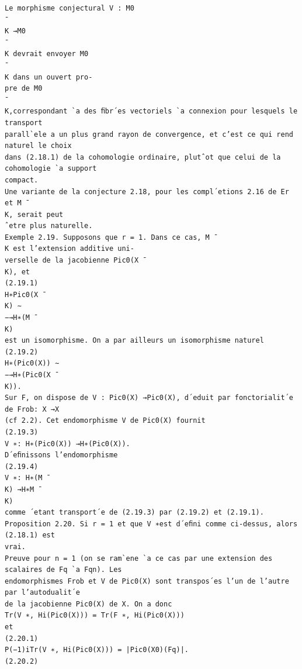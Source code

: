 \documentclass[11pt]{article}
\begin{document}
\begin{Verbatim}[breaklines=true,fontsize=\small]
Le morphisme conjectural V : M0
¯
K →M0
¯
K devrait envoyer M0
¯
K dans un ouvert pro-
pre de M0
¯
K,correspondant `a des ﬁbr´es vectoriels `a connexion pour lesquels le transport
parall`ele a un plus grand rayon de convergence, et c’est ce qui rend naturel le choix
dans (2.18.1) de la cohomologie ordinaire, plutˆot que celui de la cohomologie `a support
compact.
Une variante de la conjecture 2.18, pour les compl´etions 2.16 de Er et M ¯
K, serait peut
ˆetre plus naturelle.
Exemple 2.19. Supposons que r = 1. Dans ce cas, M ¯
K est l’extension additive uni-
verselle de la jacobienne Pic0(X ¯
K), et
(2.19.1)
H∗Pic0(X ¯
K) ∼
−→H∗(M ¯
K)
est un isomorphisme. On a par ailleurs un isomorphisme naturel
(2.19.2)
H∗(Pic0(X)) ∼
−→H∗(Pic0(X ¯
K)).
Sur F, on dispose de V : Pic0(X) →Pic0(X), d´eduit par fonctorialit´e de Frob: X →X
(cf 2.2). Cet endomorphisme V de Pic0(X) fournit
(2.19.3)
V ∗: H∗(Pic0(X)) →H∗(Pic0(X)).
D´eﬁnissons l’endomorphisme
(2.19.4)
V ∗: H∗(M ¯
K) →H∗M ¯
K)
comme ´etant transport´e de (2.19.3) par (2.19.2) et (2.19.1).
Proposition 2.20. Si r = 1 et que V ∗est d´eﬁni comme ci-dessus, alors (2.18.1) est
vrai.
Preuve pour n = 1 (on se ram`ene `a ce cas par une extension des scalaires de Fq `a Fqn). Les
endomorphismes Frob et V de Pic0(X) sont transpos´es l’un de l’autre par l’autodualit´e
de la jacobienne Pic0(X) de X. On a donc
Tr(V ∗, Hi(Pic0(X))) = Tr(F ∗, Hi(Pic0(X)))
et
(2.20.1)
P(−1)iTr(V ∗, Hi(Pic0(X))) = |Pic0(X0)(Fq)|.
(2.20.2)


\end{Verbatim}
\end{document}
